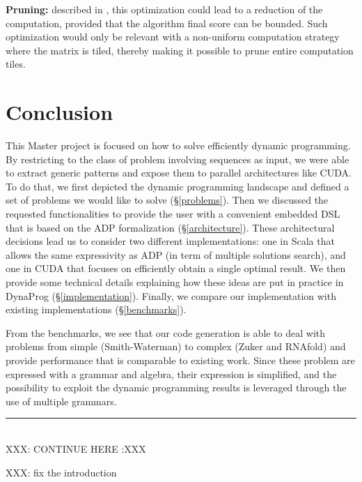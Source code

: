 \item \textbf{Pruning:} described in \cite{swat_mega}, this optimization could lead to a reduction of the computation, provided that the algorithm final score can be bounded. Such optimization would only be relevant with a non-uniform computation strategy where the matrix is tiled, thereby making it possible to prune entire computation tiles.
\ole

\section{Conclusion}
This Master project is focused on how to solve efficiently dynamic programming. By restricting to the class of problem involving sequences as input, we were able to extract generic patterns and expose them to parallel architectures like CUDA. To do that, we first depicted the dynamic programming landscape and defined a set of problems we would like to solve (\S\ref{problems}). Then we discussed the requested functionalities to provide the user with a convenient embedded DSL that is based on the ADP formalization (\S\ref{architecture}). These architectural decisions lead us to consider two different implementations: one in Scala that allows the same expressivity as ADP (in term of multiple solutions search), and one in CUDA that focuses on efficiently obtain a single optimal result. We then provide some technical details explaining how these ideas are put in practice in DynaProg (\S\ref{implementation}). Finally, we compare our implementation with existing implementations (\S\ref{benchmarks}).

From the benchmarks, we see that our code generation is able to deal with problems from simple (Smith-Waterman) to complex (Zuker and RNAfold) and provide performance that is comparable to existing work. Since these problem are expressed with a grammar and algebra, their expression is simplified, and the possibility to exploit the dynamic programming results is leveraged through the use of multiple grammars.

{\center\color{red} \noindent\rule{16cm}{0.4pt} \\ XXX: CONTINUE HERE :XXX \\}
{\color{red} XXX: fix the introduction}

